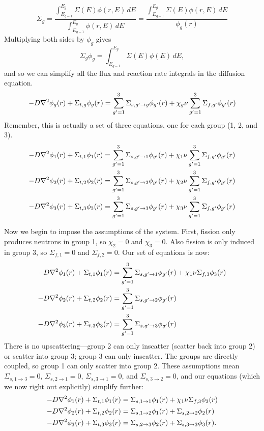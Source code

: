 \begin{enumerate}[a)]
$$ \Sigma_g = \frac{\int_{E_{g-1}}^{E_g} \Sigma(E)\phi(r,E)\,dE}{\int_{E_{g-1}}^{E_g} \phi(r,E)\,dE} = \frac{\int_{E_{g-1}}^{E_g} \Sigma(E)\phi(r,E)\,dE}{\phi_g(r)} $$
Multiplying both sides by $\phi_g$ gives
$$ \Sigma_g \phi_g = \int_{E_{g-1}}^{E_g} \Sigma(E)\phi(E)\,dE ,$$
and so we can simplify all the flux and reaction rate integrals in the diffusion equation.
$$ -D \nabla^2 \phi_g(r) + \Sigma_{t,g} \phi_g(r) = \sum_{g'=1}^3 \Sigma_{s,g' \rightarrow g}\phi_{g'}(r) + \chi_g \nu \sum_{g'=1}^3 \Sigma_{f,g'}\phi_{g'}(r) $$
Remember, this is actually a set of three equations, one for each group (1, 2, and 3).
\begin{align*}
-D \nabla^2 \phi_1(r) + \Sigma_{t,1} \phi_1(r) &= \sum_{g'=1}^3 \Sigma_{s,g' \rightarrow 1}\phi_{g'}(r) + \chi_1 \nu \sum_{g'=1}^3 \Sigma_{f,g'}\phi_{g'}(r) \\
-D \nabla^2 \phi_2(r) + \Sigma_{t,2} \phi_2(r) &= \sum_{g'=1}^3 \Sigma_{s,g' \rightarrow 2}\phi_{g'}(r) + \chi_2 \nu \sum_{g'=1}^3 \Sigma_{f,g'}\phi_{g'}(r) \\
-D \nabla^2 \phi_3(r) + \Sigma_{t,3} \phi_3(r) &= \sum_{g'=1}^3 \Sigma_{s,g' \rightarrow 3}\phi_{g'}(r) + \chi_3 \nu \sum_{g'=1}^3 \Sigma_{f,g'}\phi_{g'}(r)
\end{align*}

Now we begin to impose the assumptions of the system. First, fission only produces neutrons in group 1, so $\chi_2 = 0$ and $\chi_3 = 0$. Also fission is only induced in group 3, so $\Sigma_{f,1} = 0$ and $\Sigma_{f,2} = 0$. Our set of equations is now:
\begin{align*}
-D \nabla^2 \phi_1(r) + \Sigma_{t,1} \phi_1(r) &= \sum_{g'=1}^3 \Sigma_{s,g' \rightarrow 1}\phi_{g'}(r) + \chi_1 \nu \Sigma_{f,3}\phi_{3}(r) \\
-D \nabla^2 \phi_2(r) + \Sigma_{t,2} \phi_2(r) &= \sum_{g'=1}^3 \Sigma_{s,g' \rightarrow 2}\phi_{g'}(r) \\
-D \nabla^2 \phi_3(r) + \Sigma_{t,3} \phi_3(r) &= \sum_{g'=1}^3 \Sigma_{s,g' \rightarrow 3}\phi_{g'}(r) 
\end{align*}
There is no upscattering---group 2 can only inscatter (scatter back into group 2) or scatter into group 3; group 3 can only inscatter. The groups are directly coupled, so group 1 can only scatter into group 2. These assumptions mean $\Sigma_{s,1 \rightarrow 3} = 0$, $\Sigma_{s,2 \rightarrow 1} = 0$, $\Sigma_{s,3 \rightarrow 1} = 0$, and $\Sigma_{s,3 \rightarrow 2} = 0$, and our equations (which we now right out explicitly) simplify further:
\begin{align*}
-D \nabla^2 \phi_1(r) + \Sigma_{t,1} \phi_1(r) &= \Sigma_{s,1 \rightarrow 1}\phi_1(r) + \chi_1 \nu \Sigma_{f,3}\phi_{3}(r) \\
-D \nabla^2 \phi_2(r) + \Sigma_{t,2} \phi_2(r) &= \Sigma_{s,1 \rightarrow 2}\phi_1(r) +\Sigma_{s,2 \rightarrow 2}\phi_2(r) \\
-D \nabla^2 \phi_3(r) + \Sigma_{t,3} \phi_3(r) &= \Sigma_{s,2 \rightarrow 3}\phi_{2}(r) + \Sigma_{s,3 \rightarrow 3}\phi_{3}(r).\\
\end{align*}


\end{enumerate}
